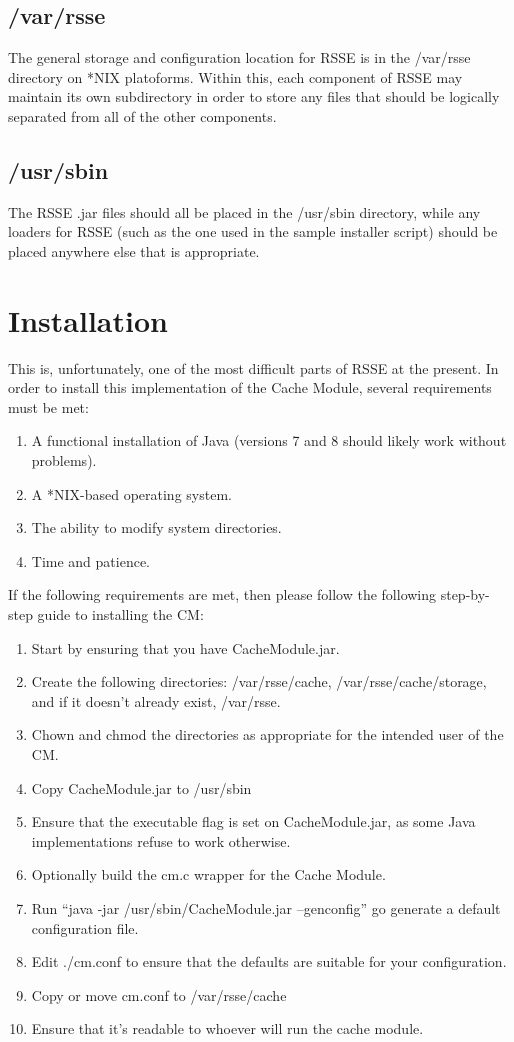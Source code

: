 \documentclass[letterpaper]{article}
\begin{document}
\subsection{/var/rsse}
The general storage and configuration location for RSSE is in the /var/rsse directory on *NIX platoforms. Within this, each component of RSSE may maintain its own subdirectory in order to store any files that should be logically separated from all of the other components.

\subsection{/usr/sbin} 
The RSSE .jar files should all be placed in the /usr/sbin directory, while any loaders for RSSE (such as the one used in the sample installer script) should be placed anywhere else that is appropriate.

\section{Installation}
This is, unfortunately, one of the most difficult parts of RSSE at the present. In order to install this implementation of the Cache Module, several requirements must be met:

\begin{enumerate}
   \item A functional installation of Java (versions 7 and 8 should likely work without problems).
   \item A *NIX-based operating system.
   \item The ability to modify system directories.
   \item Time and patience.
\end{enumerate}

If the following requirements are met, then please follow the following step-by-step guide to installing the CM:

\begin{enumerate}
   \item Start by ensuring that you have CacheModule.jar.
   \item Create the following directories: /var/rsse/cache, /var/rsse/cache/storage, and if it doesn't already exist, /var/rsse.
   \item Chown and chmod the directories as appropriate for the intended user of the CM.
   \item Copy CacheModule.jar to /usr/sbin
   \item Ensure that the executable flag is set on CacheModule.jar, as some Java implementations refuse to work otherwise.
   \item Optionally build the cm.c wrapper for the Cache Module.
   \item Run ``java -jar /usr/sbin/CacheModule.jar --genconfig'' go generate a default configuration file.
   \item Edit ./cm.conf to ensure that the defaults are suitable for your configuration.
   \item Copy or move cm.conf to /var/rsse/cache
   \item Ensure that it's readable to whoever will run the cache module.
\end{enumerate}
\end{document}
